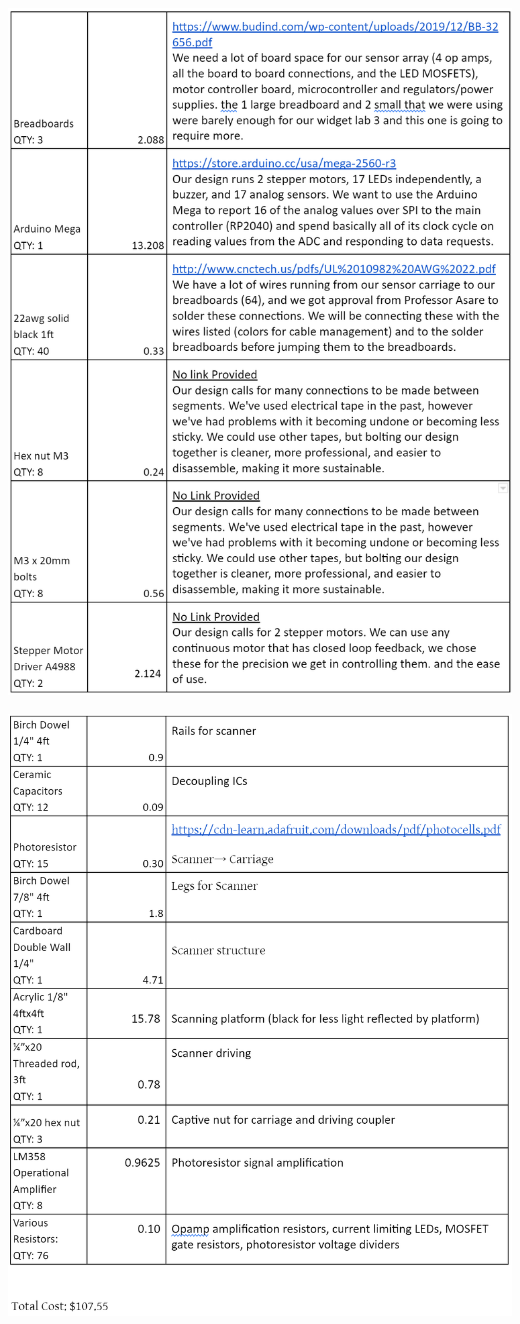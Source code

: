 \documentclass[12pt]{article}
\begin{document}
        \includegraphics[width=\linewidth]{BOMpg3.png}

        \newpage

        \includegraphics[width=\linewidth]{BOMpg4.png}
\end{document}
